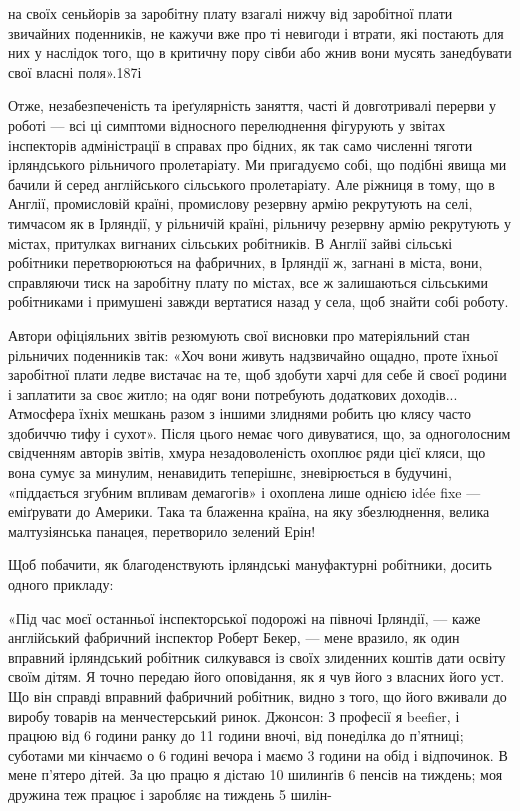\parcont{}  %
на своїх сеньйорів за заробітну плату взагалі нижчу від заробітної
плати звичайних поденників, не кажучи вже про ті невигоди
і втрати, які постають для них у наслідок того, що в критичну
пору сівби або жнив вони мусять занедбувати свої власні поля».187і

Отже, незабезпеченість та іреґулярність заняття, часті й довготривалі
перерви у роботі — всі ці симптоми відносного перелюднення
фігурують у звітах інспекторів адміністрації в справах
про бідних, як так само численні тяготи ірляндського рільничого
пролетаріату. Ми пригадуємо собі, що подібні явища ми бачили
й серед англійського сільського пролетаріату. Але ріжниця
в тому, що в Англії, промисловій країні, промислову резервну
армію рекрутують на селі, тимчасом як в Ірляндії, у рільничій
країні, рільничу резервну армію рекрутують у містах, притулках
вигнаних сільських робітників. В Англії зайві сільські робітники
перетворюються на фабричних, в Ірляндії ж, загнані в міста,
вони, справляючи тиск на заробітну плату по містах, все ж залишаються
сільськими робітниками і примушені завжди вертатися
назад у села, щоб знайти собі роботу.

Автори офіціяльних звітів резюмують свої висновки про
матеріяльний стан рільничих поденників так: «Хоч вони живуть
надзвичайно ощадно, проте їхньої заробітної плати ледве вистачає
на те, щоб здобути харчі для себе й своєї родини і заплатити
за своє житло; на одяг вони потребують додаткових доходів...
Атмосфера їхніх мешкань разом з іншими злиднями робить цю
клясу часто здобиччю тифу і сухот». Після цього немає чого
дивуватися, що, за одноголосним свідченням авторів звітів,
хмура незадоволеність охоплює ряди цієї кляси, що вона сумує
за минулим, ненавидить теперішнє, зневірюється в будучині,
«піддається згубним впливам демагогів» і охоплена лише однією
idée fixe — еміґрувати до Америки. Така та блаженна країна,
на яку збезлюднення, велика малтузіянська панацея, перетворило
зелений Ерін!

Щоб побачити, як благоденствують ірляндські мануфактурні
робітники, досить одного прикладу:

«Під час моєї останньої інспекторської подорожі на півночі
Ірляндії, — каже англійський фабричний інспектор Роберт Бекер,
— мене вразило, як один вправний ірляндський робітник
силкувався із своїх злиденних коштів дати освіту своїм дітям.
Я точно передаю його оповідання, як я чув його з власних його
уст. Що він справді вправний фабричний робітник, видно з того,
що його вживали до виробу товарів на менчестерський ринок.
Джонсон: З професії я beefier, і працюю від 6 години ранку до
11 години вночі, від понеділка до п’ятниці; суботами ми кінчаємо
о 6 годині вечора і маємо 3 години на обід і відпочинок. В мене
п’ятеро дітей. За цю працю я дістаю 10 шилинґів 6 пенсів на тиждень;
моя дружина теж працює і заробляє на тиждень 5 шилін-

